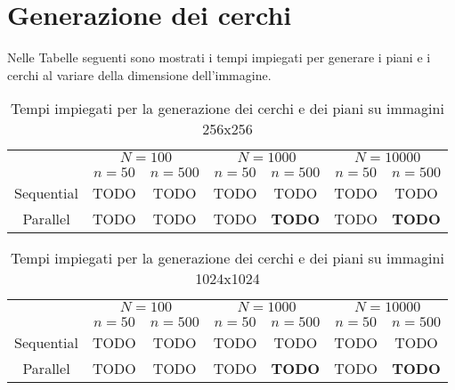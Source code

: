 
\section{Generazione dei cerchi}
Nelle Tabelle seguenti sono mostrati i tempi impiegati per generare i piani e i cerchi al variare della dimensione dell'immagine.

\begin{table}[H]
    \centering
    \begin{tabular}{c|c|c|c|c|c|c|}
        & \multicolumn{2}{|c|}{$N = 100$} & \multicolumn{2}{|c|}{$N = 1000$} & \multicolumn{2}{|c|}{$N = 10000$} \\
        & $n=50$ & $n=500$ & $n=50$ & $n=500$ & $n=50$ & $n=500$ \\
        \hline
        Sequential & TODO & TODO & TODO & TODO & TODO & TODO \\
        Parallel & TODO & TODO & TODO & \textbf{TODO} & TODO & \textbf{TODO} \\
    \end{tabular}
    \caption{\label{tab:gen256}Tempi impiegati per la generazione dei cerchi e dei piani su immagini 256x256}
\end{table}

\begin{table}[H]
    \centering
    \begin{tabular}{c|c|c|c|c|c|c|}
        & \multicolumn{2}{|c|}{$N = 100$} & \multicolumn{2}{|c|}{$N = 1000$} & \multicolumn{2}{|c|}{$N = 10000$} \\
        & $n=50$ & $n=500$ & $n=50$ & $n=500$ & $n=50$ & $n=500$ \\
        \hline
        Sequential & TODO & TODO & TODO & TODO & TODO & TODO \\
        Parallel & TODO & TODO & TODO & \textbf{TODO} & TODO & \textbf{TODO} \\
    \end{tabular}
    \caption{\label{tab:gen1024}Tempi impiegati per la generazione dei cerchi e dei piani su immagini 1024x1024}
\end{table}